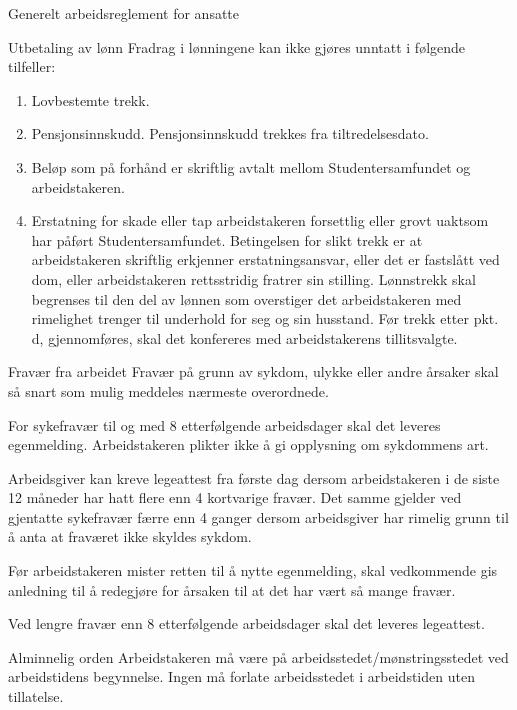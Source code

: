 \begin{lovkapittel}{Generelt arbeidsreglement for ansatte}
\begin{lovparagraf}{Utbetaling av lønn}
        Fradrag i lønningene kan ikke gjøres unntatt i følgende tilfeller:

        \begin{enumerate}
            \item Lovbestemte trekk.
            \item Pensjonsinnskudd. Pensjonsinnskudd trekkes fra tiltredelsesdato.
            \item Beløp som på forhånd er skriftlig avtalt mellom Studentersamfundet og arbeidstakeren.
            \item Erstatning for skade eller tap arbeidstakeren forsettlig eller grovt uaktsom har påført 
                Studentersamfundet. Betingelsen for slikt trekk er at arbeidstakeren skriftlig erkjenner 
                erstatningsansvar, eller det er fastslått ved dom, eller arbeidstakeren rettsstridig fratrer 
                sin stilling. Lønnstrekk skal begrenses til den del av lønnen som overstiger det arbeidstakeren 
                med rimelighet trenger til underhold for seg og sin husstand. Før trekk etter pkt. d, 
                gjennomføres, skal det konfereres med arbeidstakerens tillitsvalgte.  
        \end{enumerate} 
    \end{lovparagraf}

    \begin{lovparagraf}{Fravær fra arbeidet}
        Fravær på grunn av sykdom, ulykke eller andre årsaker skal så snart som mulig meddeles nærmeste overordnede.

        For sykefravær til og med 8 etterfølgende arbeidsdager skal det leveres egenmelding. Arbeidstakeren plikter ikke å gi
        opplysning om sykdommens art.

        Arbeidsgiver kan kreve legeattest fra første dag dersom arbeidstakeren i de siste 12 måneder har hatt flere enn 4
        kortvarige fravær. Det samme gjelder ved gjentatte sykefravær færre enn 4 ganger dersom arbeidsgiver har rimelig
        grunn til å anta at fraværet ikke skyldes sykdom.

        Før arbeidstakeren mister retten til å nytte egenmelding, skal vedkommende gis anledning til å redegjøre for årsaken
        til at det har vært så mange fravær.

        Ved lengre fravær enn 8 etterfølgende arbeidsdager skal det leveres legeattest. 
    \end{lovparagraf}

    \begin{lovparagraf}{Alminnelig orden}
        Arbeidstakeren må være på arbeidsstedet/mønstringsstedet ved arbeidstidens begynnelse.
        Ingen må forlate arbeidsstedet i arbeidstiden uten tillatelse.


\end{lovparagraf}
\end{lovkapittel}
